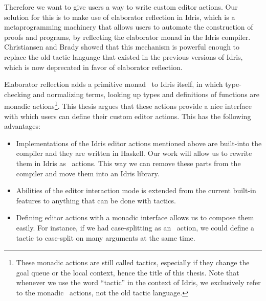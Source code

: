 Therefore we want to give users a way to write custom editor actions. Our
solution for this is to make use of elaborator reflection\cite{elabref} in
Idris, which is a metaprogramming machinery that allows users to automate the
construction of proofs and programs, by reflecting the elaborator
monad\cite{idris} in the Idris compiler. Christiansen and Brady showed that
this mechanism is powerful enough to replace the old tactic
language\cite{elabref} that existed in the previous versions of Idris, which is
now deprecated in favor of elaborator reflection.

Elaborator reflection adds a primitive monad \Elab\ to Idris itself, in which
type-checking and normalizing terms, looking up types and definitions of
functions are monadic actions\footnote{These monadic actions are still called
tactics, especially if they change the goal queue or the local context, hence the
title of this thesis. Note that whenever we use the word ``tactic'' in the
context of Idris, we exclusively refer to the monadic \Elab\ actions, not the
old tactic language.}.
This thesis argues that these actions provide a nice interface with which users
can define their custom editor actions. This has the following advantages:

\begin{itemize}
\item Implementations of the Idris editor actions mentioned above are
built-into the compiler and they are written in Haskell. Our work will allow
us to rewrite them in Idris as \Elab\ actions. This way we can remove these
parts from the compiler and move them into an Idris library.
\item Abilities of the editor interaction mode is extended from the
current built-in features to anything that can be done with tactics.
\item Defining editor actions with a monadic interface allows us to
compose them easily. For instance, if we had case-splitting as an \Elab\
action, we could define a tactic to case-split on many arguments at the same time.
\end{itemize}

